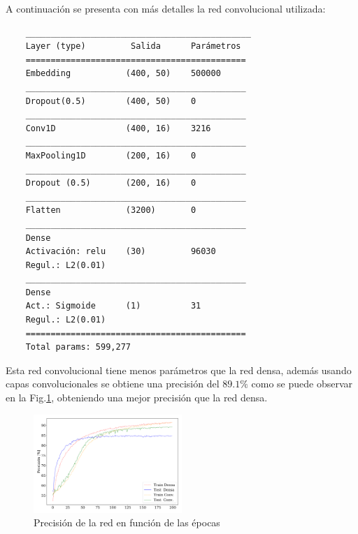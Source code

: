     A continuación se presenta con más detalles la red convolucional utilizada:
    \begin{verbatim}
    _____________________________________________
    Layer (type)         Salida      Parámetros   
    ============================================
    Embedding           (400, 50)    500000    
    ____________________________________________
    Dropout(0.5)        (400, 50)    0         
    ____________________________________________
    Conv1D              (400, 16)    3216      
    ____________________________________________
    MaxPooling1D        (200, 16)    0         
    ____________________________________________
    Dropout (0.5)       (200, 16)    0         
    ____________________________________________
    Flatten             (3200)       0         
    ____________________________________________
    Dense               
    Activación: relu    (30)         96030     
    Regul.: L2(0.01)
    ____________________________________________
    Dense
    Act.: Sigmoide      (1)          31    
    Regul.: L2(0.01)    
    ============================================
    Total params: 599,277
    \end{verbatim}

    Esta red convolucional tiene menos parámetros que la red densa, además   usando capas convolucionales se obtiene una precisión del $89.1\%$ como se puede observar en  la Fig.\ref{fig:ejer4_acc}, obteniendo una mejor precisión que la red densa.

    \begin{figure}[H]
        \begin{small}
            \begin{center}
                \includegraphics[width=0.5\textwidth]{Graphs/ejer4_acc.pdf}
            \end{center}
            \caption{Precisión de la red en función de las épocas}
            \label{fig:ejer4_acc}
        \end{small}
    \end{figure}


